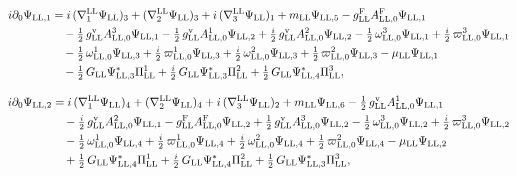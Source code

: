 \documentclass[
  10pt,
]{article}
\begin{document}
\[\begin{aligned}
i\partial_0\Psi_{{\rm LL},1}&=i\,(\nabla^{\rm LL}_1\Psi_{\rm LL})_3+(\nabla^{\rm LL}_2\Psi_{\rm LL})_3+i\,(\nabla^{\rm LL}_3\Psi_{\rm LL})_1+m_{\rm LL}\Psi_{{\rm LL},5}-g^{\rm F}_{\rm LL}A^{\rm F}_{{\rm LL},0}\Psi_{{\rm LL},1}\\
&\quad -\tfrac{1}{2}\,g^{\rm v}_{\rm LL}A^{3}_{{\rm LL},0}\Psi_{{\rm LL},1}-\tfrac{1}{2}\,g^{\rm v}_{\rm LL}A^{1}_{{\rm LL},0}\Psi_{{\rm LL},2}+\tfrac{i}{2}\,g^{\rm v}_{\rm LL}A^{2}_{{\rm LL},0}\Psi_{{\rm LL},2}-\tfrac{1}{2}\,\omega^{3}_{{\rm LL},0}\Psi_{{\rm LL},1}+\tfrac{i}{2}\,\varpi^{3}_{{\rm LL},0}\Psi_{{\rm LL},1}\\
&\quad -\tfrac{1}{2}\,\omega^{1}_{{\rm LL},0}\Psi_{{\rm LL},3}+\tfrac{i}{2}\,\varpi^{1}_{{\rm LL},0}\Psi_{{\rm LL},3}+\tfrac{i}{2}\,\omega^{2}_{{\rm LL},0}\Psi_{{\rm LL},3}+\tfrac{1}{2}\,\varpi^{2}_{{\rm LL},0}\Psi_{{\rm LL},3}-\mu_{\rm LL}\Psi_{{\rm LL},1}\\
&\quad -\tfrac{1}{2}\,G_{\rm LL}\Psi^*_{{\rm LL},3}\Pi^1_{\rm LL}+\tfrac{i}{2}\,G_{\rm LL}\Psi^*_{{\rm LL},3}\Pi^2_{\rm LL}+\tfrac{1}{2}\,G_{\rm LL}\Psi^*_{{\rm LL},4}\Pi^3_{\rm LL},
\end{aligned}\]

\[\begin{aligned}
i\partial_0\Psi_{{\rm LL},2}&=i\,(\nabla^{\rm LL}_1\Psi_{\rm LL})_4+(\nabla^{\rm LL}_2\Psi_{\rm LL})_4+i\,(\nabla^{\rm LL}_3\Psi_{\rm LL})_2+m_{\rm LL}\Psi_{{\rm LL},6}-\tfrac{1}{2}\,g^{\rm v}_{\rm LL}A^{1}_{{\rm LL},0}\Psi_{{\rm LL},1}\\
&\quad -\tfrac{i}{2}\,g^{\rm v}_{\rm LL}A^{2}_{{\rm LL},0}\Psi_{{\rm LL},1}-g^{\rm F}_{\rm LL}A^{\rm F}_{{\rm LL},0}\Psi_{{\rm LL},2}+\tfrac{1}{2}\,g^{\rm v}_{\rm LL}A^{3}_{{\rm LL},0}\Psi_{{\rm LL},2}-\tfrac{1}{2}\,\omega^{3}_{{\rm LL},0}\Psi_{{\rm LL},2}+\tfrac{i}{2}\,\varpi^{3}_{{\rm LL},0}\Psi_{{\rm LL},2}\\
&\quad -\tfrac{1}{2}\,\omega^{1}_{{\rm LL},0}\Psi_{{\rm LL},4}+\tfrac{i}{2}\,\varpi^{1}_{{\rm LL},0}\Psi_{{\rm LL},4}+\tfrac{i}{2}\,\omega^{2}_{{\rm LL},0}\Psi_{{\rm LL},4}+\tfrac{1}{2}\,\varpi^{2}_{{\rm LL},0}\Psi_{{\rm LL},4}-\mu_{\rm LL}\Psi_{{\rm LL},2}\\
&\quad +\tfrac{1}{2}\,G_{\rm LL}\Psi^*_{{\rm LL},4}\Pi^1_{\rm LL}+\tfrac{i}{2}\,G_{\rm LL}\Psi^*_{{\rm LL},4}\Pi^2_{\rm LL}+\tfrac{1}{2}\,G_{\rm LL}\Psi^*_{{\rm LL},3}\Pi^3_{\rm LL},
\end{aligned}\]
\end{document}
